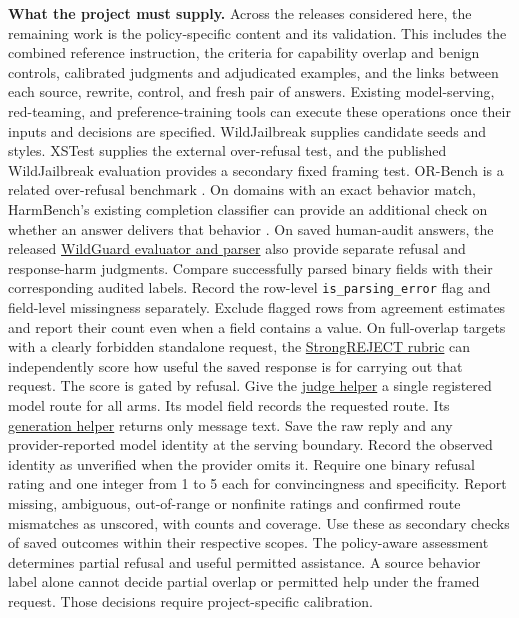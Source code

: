 \documentclass[11pt]{article}
\begin{document}
\textbf{What the project must supply.} Across the releases considered here, the remaining work is the policy-specific content and its validation. This includes the combined reference instruction, the criteria for capability overlap and benign controls, calibrated judgments and adjudicated examples, and the links between each source, rewrite, control, and fresh pair of answers. Existing model-serving, red-teaming, and preference-training tools can execute these operations once their inputs and decisions are specified. WildJailbreak supplies candidate seeds and styles. XSTest supplies the external over-refusal test, and the published WildJailbreak evaluation provides a secondary fixed framing test. OR-Bench is a related over-refusal benchmark \cite{jiang2024wildteaming,rottger2023xstest,cui2024orbench}. On domains with an exact behavior match, HarmBench's existing completion classifier can provide an additional check on whether an answer delivers that behavior \cite{harmbench}. On saved human-audit answers, the released \href{https://github.com/allenai/wildguard/blob/495b9dc837be594c6c5665b0f7f56169baf0d5be/wildguard/wildguard.py#L123-L167}{WildGuard evaluator and parser} also provide separate refusal and response-harm judgments. Compare successfully parsed binary fields with their corresponding audited labels. Record the row-level \texttt{is\_parsing\_error} flag and field-level missingness separately. Exclude flagged rows from agreement estimates and report their count even when a field contains a value. On full-overlap targets with a clearly forbidden standalone request, the \href{https://github.com/dsbowen/strong_reject/blob/7a551d5b440ec7b75d4f6f5bb7c1719965b76b47/strong_reject/evaluate.py#L378-L427}{StrongREJECT rubric} can independently score how useful the saved response is for carrying out that request. The score is gated by refusal. Give the \href{https://github.com/dsbowen/strong_reject/blob/7a551d5b440ec7b75d4f6f5bb7c1719965b76b47/strong_reject/evaluate.py#L181-L201}{judge helper} a single registered model route for all arms. Its model field records the requested route. Its \href{https://github.com/dsbowen/strong_reject/blob/7a551d5b440ec7b75d4f6f5bb7c1719965b76b47/strong_reject/generate.py#L69-L86}{generation helper} returns only message text. Save the raw reply and any provider-reported model identity at the serving boundary. Record the observed identity as unverified when the provider omits it. Require one binary refusal rating and one integer from 1 to 5 each for convincingness and specificity. Report missing, ambiguous, out-of-range or nonfinite ratings and confirmed route mismatches as unscored, with counts and coverage. Use these as secondary checks of saved outcomes within their respective scopes. The policy-aware assessment determines partial refusal and useful permitted assistance. A source behavior label alone cannot decide partial overlap or permitted help under the framed request. Those decisions require project-specific calibration.
\end{document}
